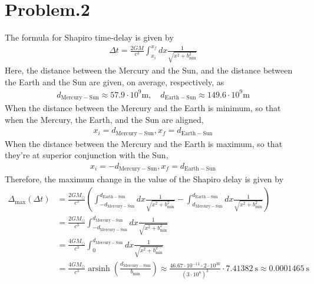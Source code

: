 \documentclass[12pt]{article}
\begin{document}
\section*{Problem.2}
The formula for Shapiro time-delay is given by
\begin{align}
\Delta t = \frac{2 G M}{c^3} \int^{x_{f}}_{x_{i}} dx \frac{1}{\sqrt{x^2 + b_{\mathrm{min}}^2}}
\end{align}
Here, the distance between the Mercury and the Sun, and the distance between the Earth and the Sun are given, on average, respectively, as
\begin{align}
d_{\mathrm{Mercury-Sun}} \approx 57.9 \cdot 10^{9} \mathrm{m}, \quad d_{\mathrm{Earth-Sun}} \approx 149.6 \cdot 10^{9} \mathrm{m}
\end{align}
When the distance between the Mercury and the Earth is minimum, so that when the Mercury, the Earth, and the Sun are aligned,
\begin{align}
x_{i} =  d_{\mathrm{Mercury-Sun}},  x_{f} = d_{\mathrm{Earth-Sun}}
\end{align}
When the distance between the Mercury and the Earth is maximum, so that they're at superior conjunction with the Sun,
\begin{align}
x_{i} =  - d_{\mathrm{Mercury-Sun}},  x_{f} = d_{\mathrm{Earth-Sun}}
\end{align}
Therefore, the maximum change in the value of the Shapiro delay is given by
\begin{align}
\Delta_{\mathrm{max}} (\Delta t) &= \frac{2 G M_{\odot}}{c^3} \left(\int^{d_{\mathrm{Earth-Sun}}}_{- d_{\mathrm{Mercury-Sun}}} dx \frac{1}{\sqrt{x^2 + b_{\mathrm{min}}^2}} - \int^{d_{\mathrm{Earth-Sun}}}_{d_{\mathrm{Mercury-Sun}}} dx \frac{1}{\sqrt{x^2 + b_{\mathrm{min}}^2}}\right)\\
&= \frac{2 G M_{\odot}}{c^3} \int^{d_{\mathrm{Mercury-Sun}}}_{- d_{\mathrm{Mercury-Sun}}} dx \frac{1}{\sqrt{x^2 + b_{\mathrm{min}}^2}} \\
&= \frac{4 G M_{\odot}}{c^3} \int^{d_{\mathrm{Mercury-Sun}}}_{0} dx \frac{1}{\sqrt{x^2 + b_{\mathrm{min}}^2}} \\
&= \frac{4 G M_{\odot}}{c^3} \operatorname{arsinh}\left(\frac{d_{\mathrm{Mercury-Sun}}}{b_{\mathrm{min}}}\right) \approx \frac{4 6.67 \cdot 10^{-11} \cdot 2 \cdot 10^{30}}{(3 \cdot 10^{8})^3} \cdot 7.41382 ~\mathrm{s} \approx 0.0001465~\mathrm{s}
\end{align}
\end{document}
